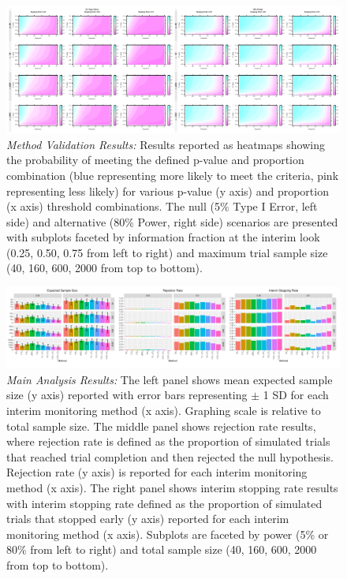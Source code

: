 \documentclass[Afour,sageh,times,square,numbers]{sagej}
\begin{document}
\begin{figure}[t]
  \begin{minipage}[t]{1\linewidth}
    \includegraphics[width=\linewidth]{06_ManuscriptOutput_Figure1.pdf}
    \caption{\textit{Method Validation Results:}  Results reported as heatmaps showing the probability of meeting the defined p-value and proportion combination (blue representing more likely to meet the criteria, pink representing less likely) for various p-value (y axis) and proportion (x axis) threshold combinations.  The null (5\% Type I Error, left side) and alternative (80\% Power, right side) scenarios are presented with subplots faceted by information fraction at the interim look (0.25, 0.50, 0.75 from left to right) and maximum trial sample size (40, 160, 600, 2000 from top to bottom).}
    \label{fig:first}
  \end{minipage}\hfill%
\end{figure}

\begin{figure}[t]
  \begin{minipage}[t]{1\linewidth}
    \includegraphics[width=\linewidth]{06_ManuscriptOutput_Figure2.pdf}
    \caption{\textit{Main Analysis Results:}  The left panel shows mean expected sample size (y axis) reported with error bars representing $\pm$ 1 SD for each interim monitoring method (x axis).  Graphing scale is relative to total sample size.  The middle panel shows rejection rate results, where rejection rate is defined as the proportion of simulated trials that reached trial completion and then rejected the null hypothesis.  Rejection rate (y axis) is reported for each interim monitoring method (x axis).  The right panel shows interim stopping rate results with interim stopping rate defined as the proportion of simulated trials that stopped early (y axis) reported for each interim monitoring method (x axis).  Subplots are faceted by power (5\% or 80\% from left to right) and total sample size (40, 160, 600, 2000 from top to bottom).}
    \label{fig:second}
  \end{minipage}\hfill%
\end{figure}
\end{document}
